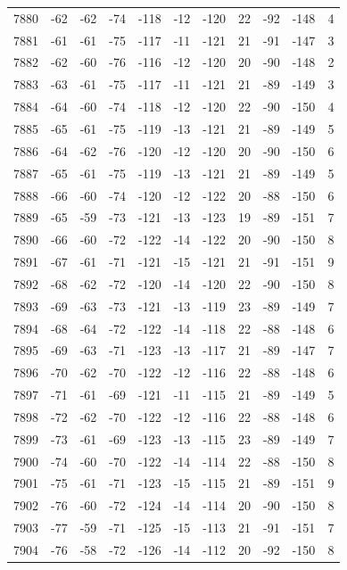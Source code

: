 \begin{table}[H]
\begin{tabular}{lllllllllll}
7880 & -62 & -62 & -74 & -118 & -12 & -120 & 22 & -92 & -148 & 4 \\
7881 & -61 & -61 & -75 & -117 & -11 & -121 & 21 & -91 & -147 & 3 \\
7882 & -62 & -60 & -76 & -116 & -12 & -120 & 20 & -90 & -148 & 2 \\
7883 & -63 & -61 & -75 & -117 & -11 & -121 & 21 & -89 & -149 & 3 \\
7884 & -64 & -60 & -74 & -118 & -12 & -120 & 22 & -90 & -150 & 4 \\
7885 & -65 & -61 & -75 & -119 & -13 & -121 & 21 & -89 & -149 & 5 \\
7886 & -64 & -62 & -76 & -120 & -12 & -120 & 20 & -90 & -150 & 6 \\
7887 & -65 & -61 & -75 & -119 & -13 & -121 & 21 & -89 & -149 & 5 \\
7888 & -66 & -60 & -74 & -120 & -12 & -122 & 20 & -88 & -150 & 6 \\
7889 & -65 & -59 & -73 & -121 & -13 & -123 & 19 & -89 & -151 & 7 \\
7890 & -66 & -60 & -72 & -122 & -14 & -122 & 20 & -90 & -150 & 8 \\
7891 & -67 & -61 & -71 & -121 & -15 & -121 & 21 & -91 & -151 & 9 \\
7892 & -68 & -62 & -72 & -120 & -14 & -120 & 22 & -90 & -150 & 8 \\
7893 & -69 & -63 & -73 & -121 & -13 & -119 & 23 & -89 & -149 & 7 \\
7894 & -68 & -64 & -72 & -122 & -14 & -118 & 22 & -88 & -148 & 6 \\
7895 & -69 & -63 & -71 & -123 & -13 & -117 & 21 & -89 & -147 & 7 \\
7896 & -70 & -62 & -70 & -122 & -12 & -116 & 22 & -88 & -148 & 6 \\
7897 & -71 & -61 & -69 & -121 & -11 & -115 & 21 & -89 & -149 & 5 \\
7898 & -72 & -62 & -70 & -122 & -12 & -116 & 22 & -88 & -148 & 6 \\
7899 & -73 & -61 & -69 & -123 & -13 & -115 & 23 & -89 & -149 & 7 \\
7900 & -74 & -60 & -70 & -122 & -14 & -114 & 22 & -88 & -150 & 8 \\
7901 & -75 & -61 & -71 & -123 & -15 & -115 & 21 & -89 & -151 & 9 \\
7902 & -76 & -60 & -72 & -124 & -14 & -114 & 20 & -90 & -150 & 8 \\
7903 & -77 & -59 & -71 & -125 & -15 & -113 & 21 & -91 & -151 & 7 \\
7904 & -76 & -58 & -72 & -126 & -14 & -112 & 20 & -92 & -150 & 8 \\

\end{tabular}
\end{table}
